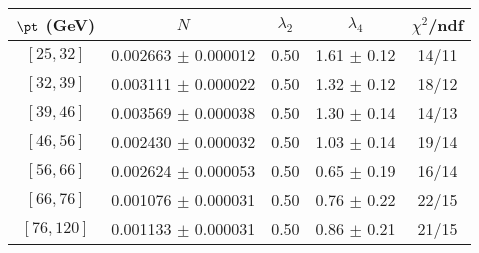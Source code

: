 \begin{tabular}{c||c|c|c|c}
$\pt$ (GeV) & $N$ & $\lambda_{2}$ & $\lambda_4$  & $\chi^2$/ndf  \\
\hline
$[25, 32]$ & 0.002663 $\pm$ 0.000012 & 0.50 & 1.61 $\pm$ 0.12 & 14/11\\
$[32, 39]$ & 0.003111 $\pm$ 0.000022 & 0.50 & 1.32 $\pm$ 0.12 & 18/12\\
$[39, 46]$ & 0.003569 $\pm$ 0.000038 & 0.50 & 1.30 $\pm$ 0.14 & 14/13\\
$[46, 56]$ & 0.002430 $\pm$ 0.000032 & 0.50 & 1.03 $\pm$ 0.14 & 19/14\\
$[56, 66]$ & 0.002624 $\pm$ 0.000053 & 0.50 & 0.65 $\pm$ 0.19 & 16/14\\
$[66, 76]$ & 0.001076 $\pm$ 0.000031 & 0.50 & 0.76 $\pm$ 0.22 & 22/15\\
$[76, 120]$ & 0.001133 $\pm$ 0.000031 & 0.50 & 0.86 $\pm$ 0.21 & 21/15\\
\end{tabular}
